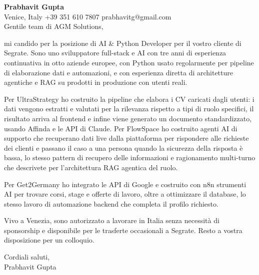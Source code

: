 \documentclass[a4paper,10.5pt]{article}
\begin{document}
\textbf{Prabhavit Gupta}\\
Venice, Italy \textbar{} +39 351 610 7807 \textbar{} prabhavitg@gmail.com\\[10pt]
Gentile team di AGM Solutions,

mi candido per la posizione di AI \& Python Developer per il vostro cliente di Segrate. Sono uno sviluppatore full-stack e AI con tre anni di esperienza continuativa in otto aziende europee, con Python usato regolarmente per pipeline di elaborazione dati e automazioni, e con esperienza diretta di architetture agentiche e RAG su prodotti in produzione con utenti reali.

Per UltraStrategy ho costruito la pipeline che elabora i CV caricati dagli utenti: i dati vengono estratti e valutati per la rilevanza rispetto a tipi di ruolo specifici, il risultato arriva al frontend e infine viene generato un documento standardizzato, usando Affinda e le API di Claude. Per FlowSpace ho costruito agenti AI di supporto che recuperano dati live dalla piattaforma per rispondere alle richieste dei clienti e passano il caso a una persona quando la sicurezza della risposta è bassa, lo stesso pattern di recupero delle informazioni e ragionamento multi-turno che descrivete per l'architettura RAG agentica del ruolo.

Per Get2Germany ho integrato le API di Google e costruito con n8n strumenti AI per trovare corsi, stage e offerte di lavoro, oltre a ottimizzare il database, lo stesso lavoro di automazione backend che completa il profilo richiesto.

Vivo a Venezia, sono autorizzato a lavorare in Italia senza necessità di sponsorship e disponibile per le trasferte occasionali a Segrate. Resto a vostra disposizione per un colloquio.

Cordiali saluti,\\
Prabhavit Gupta
\end{document}
